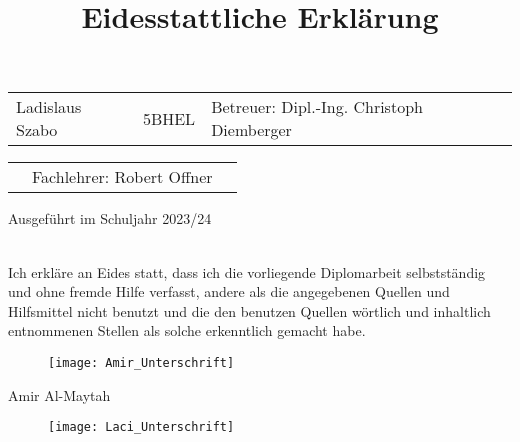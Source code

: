 \documentclass[11pt]{article}
\begin{document}
\begin{center}
	\begin{tabular}{p{3cm}p{2cm}l}
		Ladislaus Szabo & 5BHEL & Betreuer: Dipl.-Ing. Christoph Diemberger \\
	\end{tabular}

	\begin{tabular}{p{3.26cm}p{5cm}l}
		& Fachlehrer: Robert Offner 
	\end{tabular}

	\hfill \break
	\hfill \break
	\hfill \break
	\hfill \break
	\hfill \break

	Ausgeführt im Schuljahr 2023/24

\end{center}

\pagebreak


\begin{center}

	\hfill \break
	\hfill \break
	\hfill \break
	\hfill \break
	\hfill \break
	\title{\textbf{\LARGE{Eidesstattliche Erklärung}}}	
	\maketitle

\end{center}

\hfill \break
\\
Ich erkläre an Eides statt, dass ich die vorliegende Diplomarbeit selbstständig und ohne fremde Hilfe verfasst, 
andere als die angegebenen Quellen und Hilfsmittel nicht benutzt und die den benutzen Quellen wörtlich und 
inhaltlich entnommenen Stellen als solche erkenntlich gemacht habe.
\begin{figure}[h]
	\begin{center}
	\scalebox{0.5}
	{\texttt{[image: Amir\_Unterschrift]}}
	\end{center}
\end{figure}

Amir Al-Maytah
\begin{figure}[h]
	\begin{center}
	\scalebox{0.5}
	{\texttt{[image: Laci\_Unterschrift]}}
	\end{center}
\end{figure}
\end{document}
